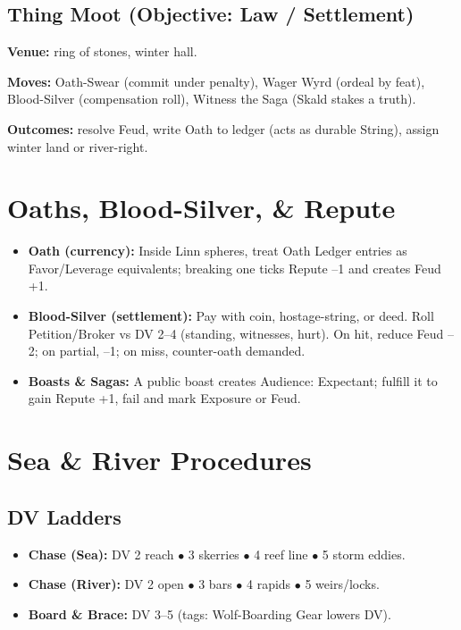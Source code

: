 \documentclass[11pt]{article}
\begin{document}
\subsection{Thing Moot (Objective: Law / Settlement)}

\textbf{Venue:} ring of stones, winter hall.

\textbf{Moves:} Oath-Swear (commit under penalty), Wager Wyrd (ordeal by feat), Blood-Silver (compensation roll), Witness the Saga (Skald stakes a truth).

\textbf{Outcomes:} resolve Feud, write Oath to ledger (acts as durable String), assign winter land or river-right.

\section{Oaths, Blood-Silver, \& Repute}
\begin{itemize}
\item \textbf{Oath (currency):} Inside Linn spheres, treat Oath Ledger entries as Favor/Leverage equivalents; breaking one ticks Repute --1 and creates Feud +1.
\item \textbf{Blood-Silver (settlement):} Pay with coin, hostage-string, or deed. Roll Petition/Broker vs DV 2--4 (standing, witnesses, hurt). On hit, reduce Feud --2; on partial, --1; on miss, counter-oath demanded.
\item \textbf{Boasts \& Sagas:} A public boast creates Audience: Expectant; fulfill it to gain Repute +1, fail and mark Exposure or Feud.
\end{itemize}

\section{Sea \& River Procedures}

\subsection{DV Ladders}
\begin{itemize}
\item \textbf{Chase (Sea):} DV 2 reach $\bullet$ 3 skerries $\bullet$ 4 reef line $\bullet$ 5 storm eddies.
\item \textbf{Chase (River):} DV 2 open $\bullet$ 3 bars $\bullet$ 4 rapids $\bullet$ 5 weirs/locks.
\item \textbf{Board \& Brace:} DV 3--5 (tags: Wolf-Boarding Gear lowers DV).
\end{itemize}
\end{document}

